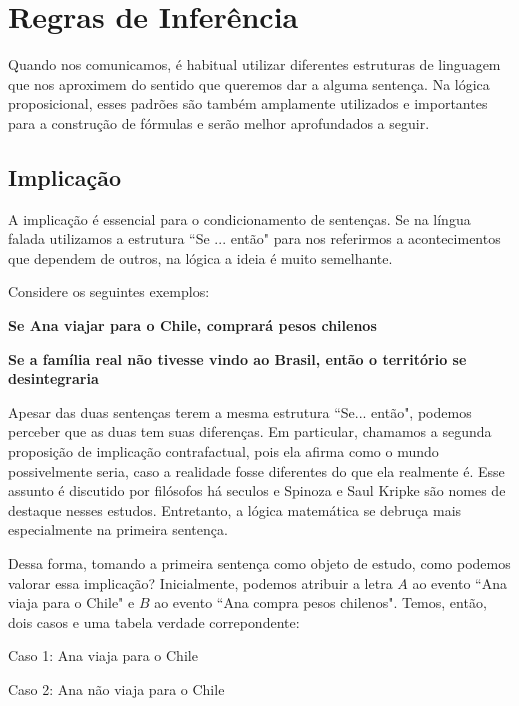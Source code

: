 \section{Regras de Inferência}
Quando nos comunicamos, é habitual utilizar diferentes estruturas de linguagem que nos aproximem do sentido que queremos dar a alguma sentença. Na lógica proposicional, esses padrões são também amplamente utilizados e importantes para a construção de fórmulas e serão melhor aprofundados a seguir.

\subsection{Implicação} 
A implicação é essencial para o condicionamento de sentenças. Se na língua falada utilizamos a estrutura ``Se ... então"  para nos referirmos a acontecimentos que dependem de outros, na lógica a ideia é muito semelhante.

Considere os seguintes exemplos:
\begin{center}
\textbf{Se Ana viajar para o Chile, comprará pesos chilenos}

\textbf{Se a família real não tivesse vindo ao Brasil, então o território se desintegraria}
\end{center}

Apesar das duas sentenças terem a mesma estrutura ``Se... então", podemos perceber que as duas tem suas diferenças. Em particular, chamamos a segunda proposição de implicação contrafactual, pois ela afirma como o mundo possivelmente seria, caso a realidade fosse diferentes do que ela realmente é. Esse assunto é discutido por filósofos há seculos e Spinoza e Saul Kripke são nomes de destaque nesses estudos. Entretanto, a lógica matemática se debruça mais especialmente na primeira sentença.

Dessa forma, tomando a primeira sentença como objeto de estudo, como podemos valorar essa implicação?
Inicialmente, podemos atribuir a letra $A$ ao evento ``Ana viaja para o Chile" e $B$ ao evento ``Ana compra pesos chilenos". Temos, então, dois casos e uma tabela verdade correpondente:

\begin{center}

Caso 1: Ana viaja para o Chile 

Caso 2: Ana não viaja para o Chile

\end{center}

